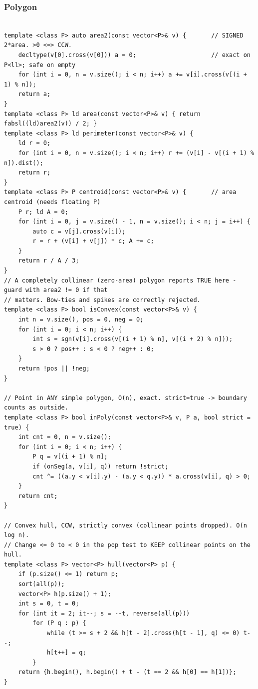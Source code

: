 \documentclass[9pt,a4paper,twocolumn]{extarticle}
\begin{document}
\filbreak
\subsubsection{Polygon}
\nopagebreak
\begin{lstlisting}

template <class P> auto area2(const vector<P>& v) {       // SIGNED 2*area. >0 <=> CCW.
    decltype(v[0].cross(v[0])) a = 0;                     // exact on P<ll>; safe on empty
    for (int i = 0, n = v.size(); i < n; i++) a += v[i].cross(v[(i + 1) % n]);
    return a;
}
template <class P> ld area(const vector<P>& v) { return fabsl((ld)area2(v)) / 2; }
template <class P> ld perimeter(const vector<P>& v) {
    ld r = 0;
    for (int i = 0, n = v.size(); i < n; i++) r += (v[i] - v[(i + 1) % n]).dist();
    return r;
}
template <class P> P centroid(const vector<P>& v) {       // area centroid (needs floating P)
    P r; ld A = 0;
    for (int i = 0, j = v.size() - 1, n = v.size(); i < n; j = i++) {
        auto c = v[j].cross(v[i]);
        r = r + (v[i] + v[j]) * c; A += c;
    }
    return r / A / 3;
}
// A completely collinear (zero-area) polygon reports TRUE here - guard with area2 != 0 if that
// matters. Bow-ties and spikes are correctly rejected.
template <class P> bool isConvex(const vector<P>& v) {
    int n = v.size(), pos = 0, neg = 0;
    for (int i = 0; i < n; i++) {
        int s = sgn(v[i].cross(v[(i + 1) % n], v[(i + 2) % n]));
        s > 0 ? pos++ : s < 0 ? neg++ : 0;
    }
    return !pos || !neg;
}

// Point in ANY simple polygon, O(n), exact. strict=true -> boundary counts as outside.
template <class P> bool inPoly(const vector<P>& v, P a, bool strict = true) {
    int cnt = 0, n = v.size();
    for (int i = 0; i < n; i++) {
        P q = v[(i + 1) % n];
        if (onSeg(a, v[i], q)) return !strict;
        cnt ^= ((a.y < v[i].y) - (a.y < q.y)) * a.cross(v[i], q) > 0;
    }
    return cnt;
}

// Convex hull, CCW, strictly convex (collinear points dropped). O(n log n).
// Change <= 0 to < 0 in the pop test to KEEP collinear points on the hull.
template <class P> vector<P> hull(vector<P> p) {
    if (p.size() <= 1) return p;
    sort(all(p));
    vector<P> h(p.size() + 1);
    int s = 0, t = 0;
    for (int it = 2; it--; s = --t, reverse(all(p)))
        for (P q : p) {
            while (t >= s + 2 && h[t - 2].cross(h[t - 1], q) <= 0) t--;
            h[t++] = q;
        }
    return {h.begin(), h.begin() + t - (t == 2 && h[0] == h[1])};
}


\end{lstlisting}
\end{document}
